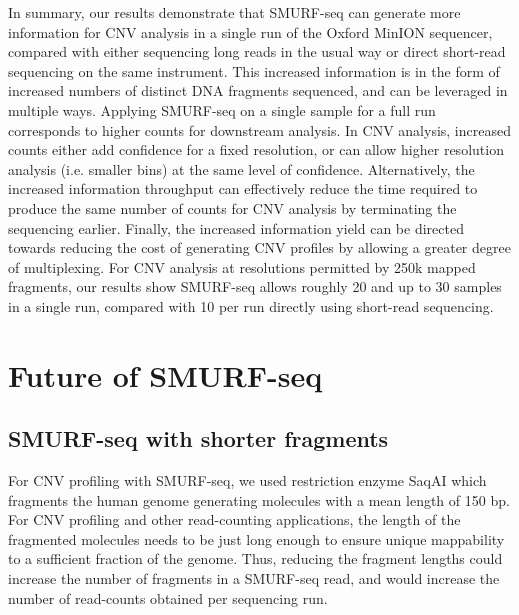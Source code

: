 In summary, our results demonstrate that SMURF-seq can generate more
information for CNV analysis in a single run of the Oxford MinION
sequencer, compared with either sequencing long reads in the usual way or
direct short-read sequencing on the same instrument.  This increased
information is in the form of increased numbers of distinct DNA
fragments sequenced, and can be leveraged in multiple ways. Applying
SMURF-seq on a single sample for a full run corresponds to higher counts
for downstream analysis. In CNV analysis, increased counts either add
confidence for a fixed resolution, or can allow higher resolution
analysis (i.e. smaller bins) at the same level of confidence.
Alternatively, the increased information throughput can effectively
reduce the time required to produce the same number of counts for CNV
analysis by terminating the sequencing earlier. Finally, the increased
information yield can be directed towards reducing the cost of
generating CNV profiles by allowing a greater degree of multiplexing.
For CNV analysis at resolutions permitted by 250k mapped fragments, our
results show SMURF-seq allows roughly 20 and up to 30 samples in a
single run, compared with 10 per run directly using short-read
sequencing.

\section{Future of SMURF-seq}
\label{future_smurf}

\subsection*{SMURF-seq with shorter fragments}
For CNV profiling with SMURF-seq, we used restriction enzyme SaqAI which
fragments the human genome generating molecules with a mean length of
150 bp. For CNV profiling and other read-counting applications, the
length of the fragmented molecules needs to be just long enough to
ensure unique mappability to a sufficient fraction of the genome. Thus,
reducing the fragment lengths could increase the number of fragments in
a SMURF-seq read, and would increase the number of read-counts obtained
per sequencing run.

